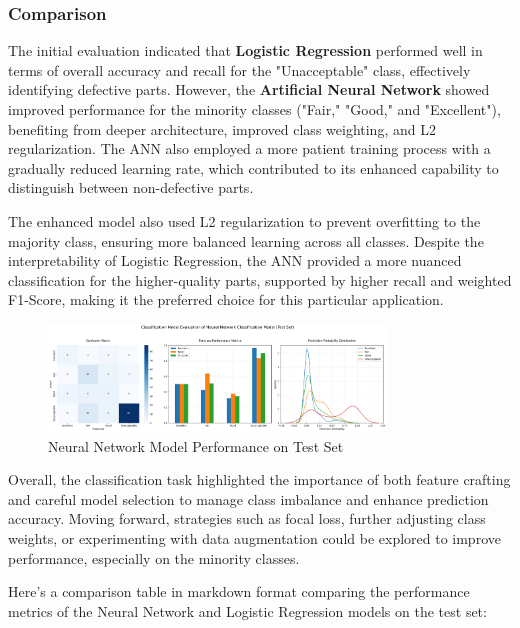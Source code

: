 \documentclass{article}
\begin{document}
\subsubsection{Comparison}

The initial evaluation indicated that \textbf{Logistic Regression} performed well in terms of overall accuracy and recall for the "Unacceptable" class, effectively identifying defective parts. However, the \textbf{Artificial Neural Network} showed improved performance for the minority classes ("Fair," "Good," and "Excellent"), benefiting from deeper architecture, improved class weighting, and L2 regularization. The ANN also employed a more patient training process with a gradually reduced learning rate, which contributed to its enhanced capability to distinguish between non-defective parts.

The enhanced model also used L2 regularization to prevent overfitting to the majority class, ensuring more balanced learning across all classes. Despite the interpretability of Logistic Regression, the ANN provided a more nuanced classification for the higher-quality parts, supported by higher recall and weighted F1-Score, making it the preferred choice for this particular application.

\begin{figure}[htbp]
    \centering
    \includegraphics[width=0.8\textwidth]{./Images/NeuralNetworkModel-TestSet-2.png}
    \caption{Neural Network Model Performance on Test Set}
    \label{fig:neural_network_model_performance_2}
\end{figure}

Overall, the classification task highlighted the importance of both feature crafting and careful model selection to manage class imbalance and enhance prediction accuracy. Moving forward, strategies such as focal loss, further adjusting class weights, or experimenting with data augmentation could be explored to improve performance, especially on the minority classes.

Here's a comparison table in markdown format comparing the performance metrics of the Neural Network and Logistic Regression models on the test set:
\end{document}

